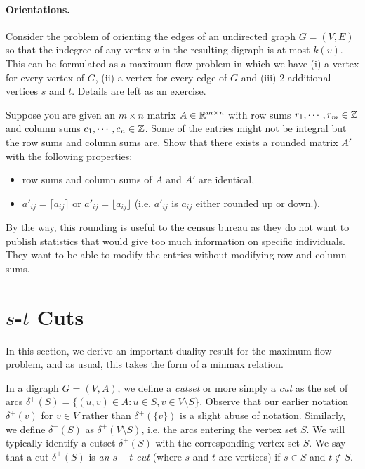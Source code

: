 \documentclass[12pt]{article}
\begin{document}
\paragraph{Orientations.}
Consider the problem of
orienting the edges of an undirected graph $G=(V,E)$ so that the
indegree of any vertex $v$ in the resulting digraph is at most
$k(v)$. This can be formulated as a maximum flow problem in which we
have (i) a vertex for every vertex of $G$, (ii) a vertex for every
edge of $G$ and (iii) 2 additional vertices $s$ and $t$. Details are
left as an exercise.

\begin{exercises}
\item
Suppose you are given an $m\times n$ matrix $A\in {\mathbb R}^{m\times n}$ with
row sums $r_1, \cdots, r_m\in {\mathbb Z}$ and column sums $c_1, \cdots, c_n\in
{\mathbb Z}$. Some of the entries might not be integral but the row sums and
column sums are. Show that there exists a rounded matrix $A'$ with the
following properties:
\begin{itemize}
\item
row sums and column sums of $A$ and $A'$ are identical,

\item
$a'_{ij}=\lceil a_{ij}\rceil$ or $a'_{ij}=\lfloor a_{ij} \rfloor$
  (i.e. $a'_{ij}$ is $a_{ij}$ either rounded up or down.).
\end{itemize}

By the way, this rounding is useful to the census bureau as they do
not want to publish statistics that would give too much information on
specific individuals. They want to be able to modify the entries
without modifying row and column sums. 
\end{exercises}

\section{$s$-$t$ Cuts}
In this section, we derive an important duality result for the maximum
flow problem, and as usual, this takes the form of a minmax relation. 

In a digraph $G=(V,A)$, we define a {\it cutset} or more simply a {\it
  cut} as the set of arcs $\delta^+(S)=\{(u,v)\in A: u\in S, v\in
  V\setminus S\}$. Observe that our earlier notation $\delta^+(v)$ for
  $v\in V$ rather than $\delta^+(\{v\})$ is
  a slight abuse of notation. Similarly, we define $\delta^-(S)$ as
  $\delta^+(V\setminus S)$, i.e. the arcs entering the vertex set
  $S$. We will typically identify a cutset $\delta^+(S)$ with the
  corresponding vertex set $S$. 
We say that a cut $\delta^+(S)$ is {\it an $s-t$ cut} (where $s$ and $t$ are
vertices) if $s\in S$ and $t\notin S$. 
\end{document}
